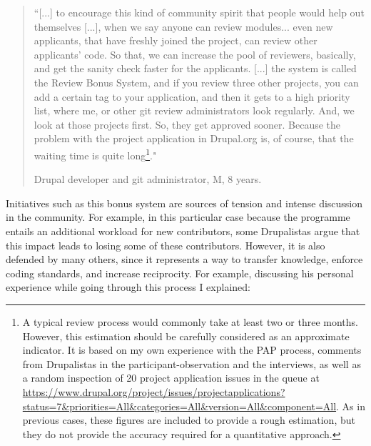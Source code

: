 \begin{quotation}
``[...] to encourage this kind of community spirit that people would help out themselves [...], when we say anyone can review modules... even new applicants, that have freshly joined the project, can review other applicants' code. So that, we can increase the pool of reviewers, basically, and get the sanity check faster for the applicants. [...] the system is called the Review Bonus System, and if you review three other projects, you can add a certain tag to your application, and then it gets to a high priority list, where me, or other git review administrators look regularly. And, we look at those projects first. So, they get approved sooner. Because the problem with the project application in Drupal.org is, of course, that the waiting time is quite long\footnote{A typical review process would commonly take at least two or three months. However, this estimation should be carefully considered as an approximate indicator. It is based on my own experience with the PAP process, comments from Drupalistas in the participant-observation and the interviews, as well as a random inspection of 20 project application issues in the queue at \url{https://www.drupal.org/project/issues/projectapplications?status=7&priorities=All&categories=All&version=All&component=All}. As in previous cases, these figures are included to provide a rough estimation, but they do not provide the accuracy required for a quantitative approach.}."
\begin{flushright}\footnotesize{Drupal developer and git administrator, M, 8 years.}\end{flushright}
\end{quotation}

Initiatives such as this bonus system are sources of tension and intense discussion in the community. For example, in this particular case because the programme entails an additional workload for new contributors, some Drupalistas argue that this impact leads to losing some of these contributors. However, it is also defended by many others, since it represents a way to transfer knowledge, enforce coding standards, and increase reciprocity. For example, discussing his personal experience while going through this process I explained:

